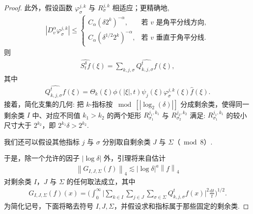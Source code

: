 \begin{proof}
此外，假设函数 $\varphi_{\sigma}^{j,k}$ 与 $R_{\sigma}^{j,k}$ 相适应；更精确地,
\begin{align*}
  |D_{v}^{\alpha}\varphi_{\sigma}^{j,k}|\leq
  \begin{cases}
    C_{\alpha}\left(\delta2^{k}\right)^{-\alpha}, & \text{若 } v \text{ 是角平分线方向},\\
    C_{\alpha}\left(\delta^{1/2}2^{k}\right)^{-\alpha}, & \text{若 } v \text{ 垂直于角平分线}.
  \end{cases}
\end{align*}
则
\begin{align*}
  \widehat{S_{t}^{\delta}f}(\xi)=\sum_{k,j,\sigma}\widehat{Q_{k,j,\sigma}^{t}f}(\xi),
\end{align*}
其中
\begin{align*}
  \widehat{Q_{k,j,\sigma}^{t}f}(\xi)=\Theta_{k}(\xi)\phi(|\xi|,t)\psi_{j}(\xi)\varphi_{\sigma}^{j,k}(\xi)\widehat{f}(\xi).
\end{align*}
接着，简化支集的几何: 把 $k$-指标按 $\bmod[|\log_{2}(\delta)|]$ 分成剩余类，使得同一剩余类 $I$ 中、对应不同值 $k_1 > k_2$ 的两个矩形 $R_{\sigma_1}^{j_1,k_1}$ 与 $R_{\sigma_2}^{j_2,k_2}$ 满足: $R_{\sigma_1}^{j_1,k_1}$ 的较小尺寸大于 $2^{k_2}$，即 $2^{k_1}\delta > 2^{k_2}$.

我们还可以假设其他指标 $j$ 与 $\sigma$ 分别取自剩余类 $J$ 与 $\Sigma$（$\bmod 8$）.

于是，除一个允许的因子 $|\log \delta|$ 外，引理将来自估计
\begin{align*}
  \left\|G_{I,J,\Sigma}(f)\right\|_{4}\lesssim\left|\log\delta\right|^{a}\left\|f\right\|_{4}
\end{align*}
对剩余类 $I$，$J$ 与 $\Sigma$ 的任何取法成立，其中
\begin{align*}
  G_{I,J,\Sigma}(f)(x)=\Big(\int_{0}^{\infty}\Big|\sum_{k\in I}\sum_{j\in J}\sum_{\sigma\in\Sigma}Q_{k,j,\sigma}^{t}f(x)\Big|^{2}\frac{\mathrm{d}t}{t}\Big)^{1/2}.
\end{align*}
为简化记号，下面将略去符号 $I, J, \Sigma$，并假设求和指标属于那些固定的剩余类.


\end{proof}
